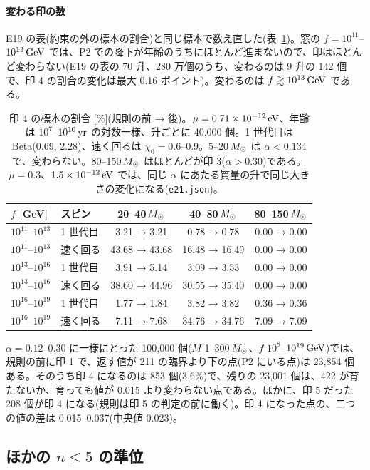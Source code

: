 \paragraph{変わる印の数}
E19 の表(約束の外の標本の割合)と同じ標本で数え直した(表~\ref{tab:e21flags})。窓の $f=10^{11}$--$10^{13}\,\mathrm{GeV}$ では、P2 での降下が年齢のうちにほとんど進まないので、印はほとんど変わらない(E19 の表の 70 升、280 万個のうち、変わるのは 9 升の 142 個で、印 4 の割合の変化は最大 0.16 ポイント)。変わるのは $f\gtrsim10^{13}\,\mathrm{GeV}$ である。
\begin{table}[H]
\centering\small
\begin{tabular}{llccc}
\toprule
$f$ [GeV] & スピン & 20--40$\,M_\odot$ & 40--80$\,M_\odot$ & 80--150$\,M_\odot$\\
\midrule
$10^{11}$--$10^{13}$ & 1 世代目 & 3.21 → 3.21 & 0.78 → 0.78 & 0.00 → 0.00\\
$10^{11}$--$10^{13}$ & 速く回る & 43.68 → 43.68 & 16.48 → 16.49 & 0.00 → 0.00\\
$10^{13}$--$10^{16}$ & 1 世代目 & 3.91 → 5.14 & 3.09 → 3.53 & 0.00 → 0.00\\
$10^{13}$--$10^{16}$ & 速く回る & 38.60 → 44.96 & 30.55 → 35.40 & 0.00 → 0.00\\
$10^{16}$--$10^{19}$ & 1 世代目 & 1.77 → 1.84 & 3.82 → 3.82 & 0.36 → 0.36\\
$10^{16}$--$10^{19}$ & 速く回る & 7.11 → 7.68 & 34.76 → 34.76 & 7.09 → 7.09\\
\bottomrule
\end{tabular}
\caption{印 4 の標本の割合 [\%](規則の前 → 後)。$\mu=0.71\times10^{-12}\,\mathrm{eV}$、年齢は $10^7$--$10^{10}\,\mathrm{yr}$ の対数一様、升ごとに 40{,}000 個。1 世代目は Beta(0.69, 2.28)、速く回るは $\chi_0=0.6$--0.9。5--20$\,M_\odot$ は $\alpha<0.134$ で、変わらない。80--150$\,M_\odot$ はほとんどが印 3($\alpha>0.30$)である。$\mu=0.3$、$1.5\times10^{-12}\,\mathrm{eV}$ では、同じ $\alpha$ にあたる質量の升で同じ大きさの変化になる(\texttt{e21.json})。}
\label{tab:e21flags}
\end{table}
$\alpha=0.12$--0.30 に一様にとった 100{,}000 個($M$ 1--300$\,M_\odot$、$f$ $10^8$--$10^{19}\,\mathrm{GeV}$)では、規則の前に印 1 で、返す値が 211 の臨界より下の点(P2 にいる点)は 23{,}854 個ある。そのうち印 4 になるのは 853 個(3.6\%)で、残りの 23{,}001 個は、422 が育たないか、育っても値が 0.015 より変わらない点である。ほかに、印 5 だった 208 個が印 4 になる(規則は印 5 の判定の前に働く)。印 4 になった点の、二つの値の差は 0.015--0.037(中央値 0.023)。

\subsection{ほかの $n\le5$ の準位}

